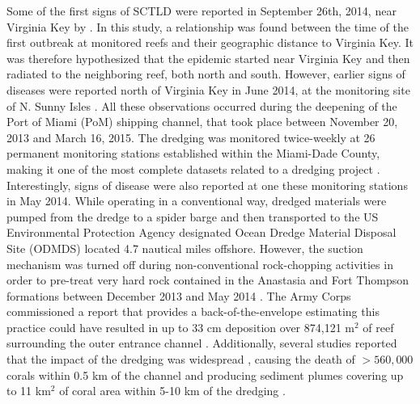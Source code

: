 \documentclass[preprint,12pt,authoryear]{elsarticle}
\begin{document}
Some of the first signs of SCTLD were reported in September 26th, 2014, near Virginia Key by \cite{precht2016unprecedented}. In this study, a relationship was found between the time of the first outbreak at monitored reefs and their geographic distance to Virginia Key. It was therefore hypothesized that the epidemic started near Virginia Key and then radiated to the neighboring reef, both north and south. However, earlier signs of diseases were reported north of Virginia Key in June 2014, at the monitoring site of N. Sunny Isles \citep{precht2016unprecedented}. All these observations occurred during the deepening of the Port of Miami (PoM) shipping channel, that took place between November 20, 2013 and March 16, 2015. The dredging was monitored twice-weekly at 26 permanent monitoring stations established within the Miami-Dade County, making it one of the most complete datasets related to a dredging project \citep{gintert2019regional}. Interestingly, signs of disease were also reported at one these monitoring stations in May 2014. While operating in a conventional way, dredged materials were pumped from the dredge to a spider barge and then transported to the US Environmental Protection Agency designated Ocean Dredge Material Disposal Site (ODMDS) located 4.7 nautical miles offshore. However, the suction mechanism was turned off during non-conventional rock-chopping activities in order to pre-treat very hard rock contained in the Anastasia and Fort Thompson formations between December 2013 and May 2014 \citep{miller2016detecting}. The Army Corps commissioned a report that provides a back-of-the-envelope estimating this practice could have resulted in up to 33 cm deposition over 874,121 m$^2$ of reef surrounding the outer entrance channel \citep{dobbelaere2020report}. Additionally, several studies reported that the impact of the dredging was widespread \citep{miller2016detecting}, causing the death of  $> 560,000$ corals within 0.5 km of the channel \citep{cunning2019extensive} and producing sediment plumes covering up to 11 km$^2$ of coral area within 5-10 km of the dredging \citep{barnes2015sediment}.
\end{document}
